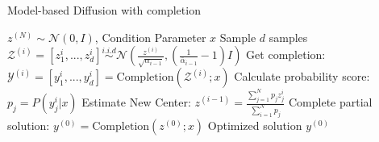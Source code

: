 \begin{algorithm}
\caption{Model-based Diffusion with completion}
\label{algo:model-based-diffusion}
\begin{algorithmic}[1]
\REQUIRE $z^{(N)} {\sim} \mathcal{N}(0, I)$, Condition Parameter $x$
    \STATE Sample $d$ samples $\mathcal{Z}^{(i)}=[z_1^i,...,z_d^i] \overset{i.i.d}{\sim} \mathcal{N}\left(\frac{z^{(i)}}{\sqrt{\alpha_{i-1}}}, \left(\frac{1}{\bar{\alpha}_{i-1}} - 1\right)I\right)$
    \STATE Get completion: $\mathcal{Y}^{(i)}=[y_1^i,...,y_d^i] = \mathrm{Completion}(\mathcal{Z}^{(i)};x)$
    \STATE Calculate probability score: $p_j = P(y_j^i|x)$
    \STATE Estimate New Center: $z^{(i-1)} = \frac{\sum_{j=1}^{N}p_jz^i_j}{\sum_{i=1}^{N}p_j}$
\ENDFOR
\STATE Complete partial solution: $y^{(0)} = \mathrm{Completion}(z^{(0)};x)$
\ENSURE Optimized solution $y^{(0)}$
\end{algorithmic}
\end{algorithm}